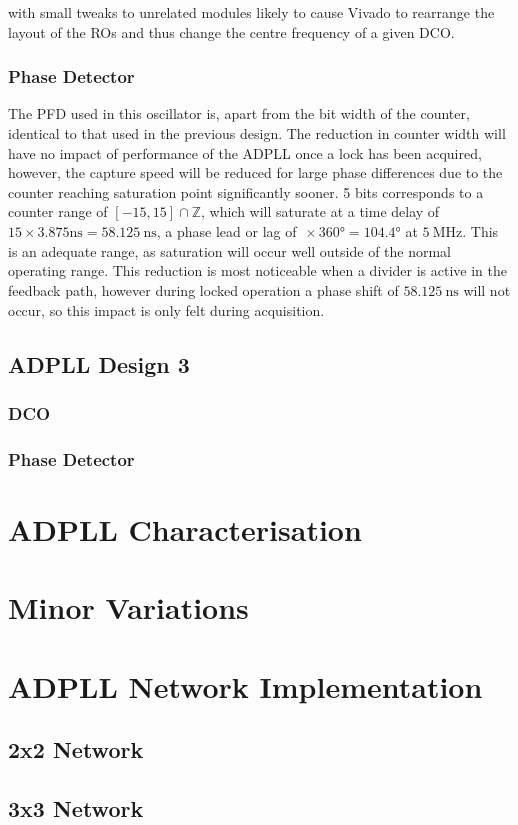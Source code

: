 with small tweaks to unrelated modules likely to cause Vivado to rearrange the layout of the \ac{RO}s and thus change the centre frequency of a given \ac{DCO}.

\subsubsection{Phase Detector}
The \ac{PFD} used in this oscillator is, apart from the bit width of the counter, identical to that used in the previous design. The reduction in counter width will have no impact of performance of the \ac{ADPLL} once a lock has been acquired, however, the capture speed will be reduced for large phase differences due to the counter reaching saturation point significantly sooner. 5 bits corresponds to a counter range of $[-15,15]\cap\mathbb{Z}$, which will saturate at a time delay of $15\times3.875\si{\nano\second} = 58.125~\si{\nano\second}$, a phase lead or lag of $\frac{}{}\times360\si{\degree} = 104.4\si{\degree}$ at $5~\si{\mega\hertz}$. This is an adequate range, as saturation will occur well outside of the normal operating range. This reduction is most noticeable when a divider is active in the feedback path, however during locked operation a phase shift of $58.125~\si{\nano\second}$ will not occur, so this impact is only felt during acquisition.

\subsection{\acs{ADPLL} Design 3}
\subsubsection{\acl{DCO}}
\subsubsection{Phase Detector}


\section{\acs{ADPLL} Characterisation}

\section{Minor Variations}\label{section:minor_variations}

\section{\acs{ADPLL} Network Implementation}
\subsection{2x2 Network}
\subsection{3x3 Network}
